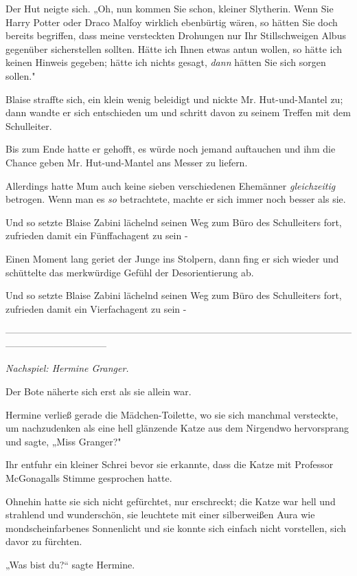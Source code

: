 {Der Hut neigte sich. „Oh, nun kommen Sie schon, kleiner Slytherin. Wenn Sie Harry Potter oder Draco Malfoy wirklich ebenbürtig wären, so hätten Sie doch bereits begriffen, dass meine versteckten Drohungen nur Ihr Stillschweigen Albus gegenüber sicherstellen sollten. Hätte ich Ihnen etwas antun wollen, so hätte ich keinen Hinweis gegeben; hätte ich nichts gesagt, \emph{dann} hätten Sie sich sorgen sollen."

Blaise straffte sich, ein klein wenig beleidigt und nickte Mr. Hut-und-Mantel zu; dann wandte er sich entschieden um und schritt davon zu seinem Treffen mit dem Schulleiter.

Bis zum Ende hatte er gehofft, es würde noch jemand auftauchen und ihm die Chance geben Mr. Hut-und-Mantel ans Messer zu liefern.

Allerdings hatte Mum auch keine sieben verschiedenen Ehemänner \emph{gleichzeitig} betrogen. Wenn man es \emph{so} betrachtete, machte er sich immer noch besser als sie.

Und so setzte Blaise Zabini lächelnd seinen Weg zum Büro des Schulleiters fort, zufrieden damit ein Fünffachagent zu sein -

Einen Moment lang geriet der Junge ins Stolpern, dann fing er sich wieder und schüttelte das merkwürdige Gefühl der Desorientierung ab.

Und so setzte Blaise Zabini lächelnd seinen Weg zum Büro des Schulleiters fort, zufrieden damit ein Vierfachagent zu sein -

--------------------------------------------------------------------------------------------------------------------------------------------

\hfill\break \emph{Nachspiel: Hermine Granger.}

Der Bote näherte sich erst als sie allein war.

Hermine verließ gerade die Mädchen-Toilette, wo sie sich manchmal versteckte, um nachzudenken als eine hell glänzende Katze aus dem Nirgendwo hervorsprang und sagte, „Miss Granger?"

Ihr entfuhr ein kleiner Schrei bevor sie erkannte, dass die Katze mit Professor McGonagalls Stimme gesprochen hatte.

Ohnehin hatte sie sich nicht gefürchtet, nur erschreckt; die Katze war hell und strahlend und wunderschön, sie leuchtete mit einer silberweißen Aura wie mondscheinfarbenes Sonnenlicht und sie konnte sich einfach nicht vorstellen, sich davor zu fürchten.

„Was bist du?“ sagte Hermine.

}
